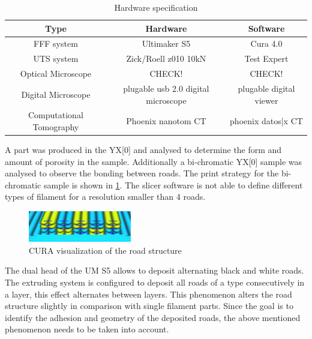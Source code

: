 \begin{table}[h]
	\centering
	\caption{Hardware specification}
	\label{tab:hardware}
	\begin{tabular}{ccc}
		Type  & Hardware & Software    \\
		\hline
		FFF system & Ultimaker S5 & Cura 4.0 \\
		UTS system & Zick/Roell z010 10kN & Test Expert \\
		Optical Microscope & CHECK! & CHECK! \\		
        Digital Microscope & plugable usb 2.0 digital microscope & plugable digital viewer \\
		Computational Tomography & Phoenix nanotom CT  & phoenix datos|x CT \\

	

		\hline
	\end{tabular}
\end{table}

A part was produced in the YX[0] and analysed to determine the form and amount of porosity in the sample. Additionally a bi-chromatic YX[0] sample was analysed to observe the bonding between roads. The print strategy for the bi-chromatic sample is shown in \ref{fig:colorroads}. The slicer software is not able to define different types of filament for a resolution smaller than 4 roads. 

\begin{figure}[H]
    \centering
    \includegraphics[width=0.4\textwidth]{chapter_4_RVE_Definition/figures/colorroads.PNG}
    \caption{CURA visualization of the road structure}
    \label{fig:colorroads}
\end{figure}

The dual head of the UM S5  allows to deposit alternating black and white roads. The extruding system is configured to deposit all roads of a type consecutively in a layer, this effect alternates between layers. This phenomenon alters the road structure slightly in comparison with single filament parts. Since the goal is to identify the adhesion and geometry of the deposited roads, the above mentioned phenomenon needs to be taken into account.

